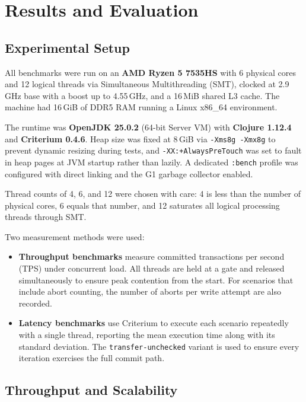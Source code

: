 \chapter{Results and Evaluation}
\label{ch:results}

\section{Experimental Setup}

All benchmarks were run on an \textbf{AMD Ryzen 5 7535HS} with 6 physical
cores and 12 logical threads via Simultaneous Multithreading (SMT), clocked
at 2.9\,GHz base with a boost up to 4.55\,GHz, and a 16\,MiB shared L3
cache. The machine had 16\,GiB of DDR5 RAM running a Linux x86\_64 environment.

The runtime was \textbf{OpenJDK 25.0.2} (64-bit Server VM) with
\textbf{Clojure 1.12.4} and \textbf{Criterium 0.4.6}. Heap size was fixed at 8\,GiB via
\texttt{-Xms8g -Xmx8g} to prevent dynamic resizing during tests, and
\texttt{-XX:+AlwaysPreTouch} was set to fault in heap pages at JVM startup
rather than lazily.  A dedicated \texttt{:bench} profile was configured with
direct linking and the G1 garbage collector enabled.

Thread counts of 4, 6, and 12 were chosen with care: 4 is less than the
number of physical cores, 6 equals that number, and 12 saturates all
logical processing threads through SMT.

Two measurement methods were used:

\begin{itemize}
  \item \textbf{Throughput benchmarks} measure committed transactions per
        second (TPS) under concurrent load. All threads are held at a gate
        and released simultaneously to ensure peak contention from the start.
        For scenarios that include abort counting, the number of aborts per
        write attempt are also recorded.

  \item \textbf{Latency benchmarks} use Criterium to execute each scenario
        repeatedly with a single thread, reporting the mean execution time
        along with its standard deviation. The \texttt{transfer-unchecked} variant is used
        to ensure every iteration exercises the full commit path.
\end{itemize}

\section{Throughput and Scalability}

